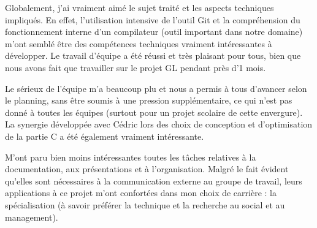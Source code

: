 \hspace{1cm}Globalement, j'ai vraiment aimé le sujet traité et les aspects techniques impliqués.
En effet, l'utilisation intensive de l'outil Git et la compréhension du fonctionnement interne d'un compilateur (outil important dans notre domaine) m'ont semblé être des compétences techniques vraiment intéressantes à développer.
Le travail d'équipe a été réussi et très plaisant pour tous, bien que nous avons fait que travailler sur le projet GL pendant près d'1 mois.

\hspace{1cm}Le sérieux de l'équipe m'a beaucoup plu et nous a permis à tous d'avancer selon le planning, sans être soumis à une pression supplémentaire, ce qui n'est pas donné à toutes les équipes (surtout pour un projet scolaire de cette envergure). 
La synergie développée avec Cédric lors des choix de conception et d'optimisation de la partie C a été également vraiment intéressante.

\hspace{1cm}M'ont paru bien moins intéressantes toutes les tâches relatives à la documentation, aux présentations et à l'organisation.
Malgré le fait évident qu'elles sont nécessaires à la communication externe au groupe de travail, leurs applications à ce projet m'ont confortées dans mon choix de carrière : la spécialisation (à savoir préférer la technique et la recherche au social et au management).



